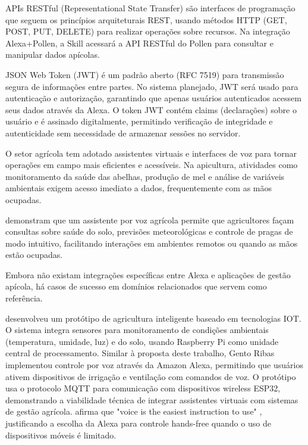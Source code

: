
APIs RESTful (Representational State Transfer) são interfaces de programação que seguem os princípios arquiteturais REST, usando métodos HTTP (GET, POST, PUT, DELETE) para realizar operações sobre recursos. Na integração Alexa+Pollen, a Skill acessará a API RESTful do Pollen para consultar e manipular dados apícolas.

JSON Web Token (JWT) é um padrão aberto (RFC 7519) para transmissão segura de informações entre partes. No sistema planejado, JWT será usado para autenticação e autorização, garantindo que apenas usuários autenticados acessem seus dados através da Alexa. O token JWT contém claims (declarações) sobre o usuário e é assinado digitalmente, permitindo verificação de integridade e autenticidade sem necessidade de armazenar sessões no servidor.


O setor agrícola tem adotado assistentes virtuais e interfaces de voz para tornar operações em campo mais eficientes e acessíveis. Na apicultura, atividades como monitoramento da saúde das abelhas, produção de mel e análise de variáveis ambientais exigem acesso imediato a dados, frequentemente com as mãos ocupadas.

\textcite{rajanala2025} demonstram que um assistente por voz agrícola permite que agricultores façam consultas sobre saúde do solo, previsões meteorológicas e controle de pragas de modo intuitivo, facilitando interações em ambientes remotos ou quando as mãos estão ocupadas.

Embora não existam integrações específicas entre Alexa e aplicações de gestão apícola, há casos de sucesso em domínios relacionados que servem como referência.

\textcite{gento2019iot} desenvolveu um protótipo de agricultura inteligente baseado em tecnologias IOT. O sistema integra sensores para monitoramento de condições ambientais (temperatura, umidade, luz) e do solo, usando Raspberry Pi como unidade central de processamento. Similar à proposta deste trabalho, Gento Ribas implementou controle por voz através da Amazon Alexa, permitindo que usuários ativem dispositivos de irrigação e ventilação com comandos de voz. O protótipo usa o protocolo MQTT para comunicação com dispositivos wireless ESP32, demonstrando a viabilidade técnica de integrar assistentes virtuais com sistemas de gestão agrícola. \textcite{gento2019iot} afirma que "voice is the easiest instruction to use" \cite[p. 45]{gento2019iot}, justificando a escolha da Alexa para controle hands-free quando o uso de dispositivos móveis é limitado.

